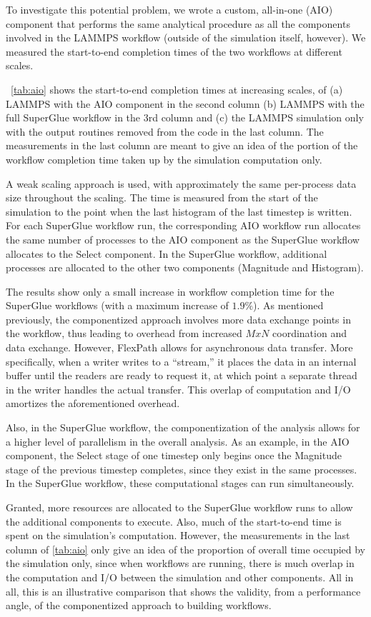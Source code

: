 To investigate this potential problem,
we wrote a custom, all-in-one (AIO) component
that performs the same analytical procedure
as all the components involved in the LAMMPS workflow
(outside of the simulation itself, however).
We measured
the start-to-end completion times of the two workflows 
at different scales.

~\autoref{tab:aio} shows the start-to-end
completion times
at increasing scales, of
(a) LAMMPS with the AIO component
in the second column
(b) LAMMPS with the full SuperGlue workflow in the 3rd column
and (c) the LAMMPS simulation only with the output routines
removed from the code in the last column.
The measurements in the last column
are meant to give an idea of the portion
of the workflow completion time taken up by the simulation
computation only.

A weak scaling approach
is used, with approximately the same
per-process data size throughout the scaling.
The time is measured from the start of the simulation
to the point when the last histogram of
the last timestep is written.
For each SuperGlue workflow run, the corresponding
AIO workflow run allocates the same
number of processes to the AIO component
as the SuperGlue workflow allocates to the Select component.
In the SuperGlue workflow, additional processes
are allocated to the other two components
(Magnitude and Histogram).

The results show only a small increase in
workflow completion time for the SuperGlue
workflows (with a maximum increase of $1.9 \%$).
As mentioned previously, the componentized
approach involves more data exchange points
in the workflow, thus leading to
overhead from increased $MxN$ coordination and data exchange.
However, FlexPath allows
for asynchronous data transfer.
More specifically, when a writer writes to
a ``stream,'' it places
the data in an internal buffer
until the readers are ready to request it,
at which point a separate thread in the writer
handles the actual transfer.
This overlap
of computation and I/O
amortizes the aforementioned overhead.

Also, in the SuperGlue workflow,
the componentization of the analysis
allows for a higher level of parallelism in the overall
analysis. As an example, in the AIO component,
the Select stage of one timestep
only begins once the Magnitude
stage of the previous timestep
completes, since they exist in the same processes.
In the SuperGlue workflow, these
computational stages can run simultaneously.

Granted, more resources are allocated to the
SuperGlue workflow runs to allow the additional
components to execute.
Also, much of the start-to-end time is spent on
the simulation's computation.
However, the measurements in the last column
of \autoref{tab:aio}
only give an idea of the proportion of 
overall time occupied by the simulation only,
since when workflows are running, there is much
overlap in the computation and I/O between the
simulation and other components.
All in all, this is
an illustrative comparison that shows the validity,
from a performance angle,
of the componentized approach
to building workflows.

